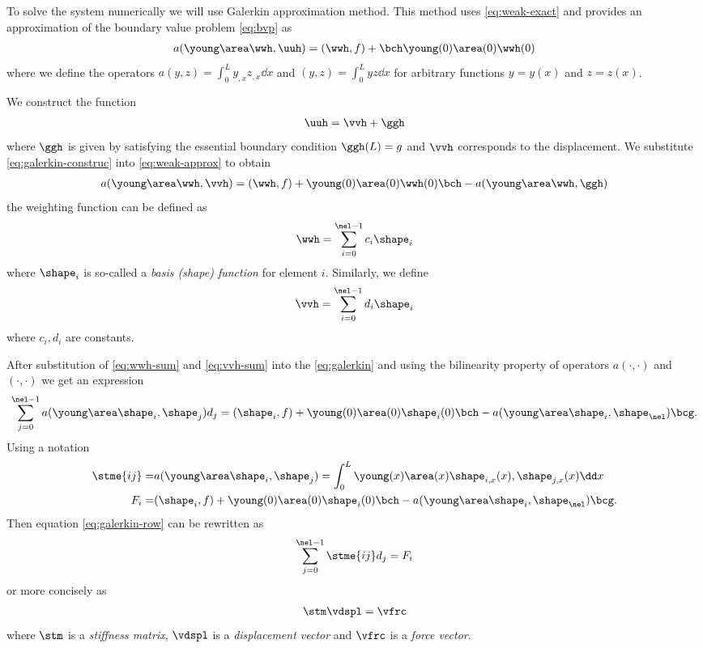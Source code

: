 \documentclass[twoside,a4paper,12pt]{article}
\newcommand{\+}[2]{\newcommand#1{{\color{\notcolor}#2}}}
\newcommand{\1}[2]{\newcommand{#1}[1]{{\color{\notcolor}#2}}}
\newcommand{\2}[2]{\newcommand{#1}[2]{{\color{\notcolor}#2}}}
\begin{document}
To solve the system numerically we will use Galerkin approximation
method. This method uses \eqref{eq:weak-exact} and provides an
approximation of the boundary value problem \eqref{eq:bvp} as
%
\begin{align}
a(\young\area\wwh,\uuh) = (\wwh,f) + \bch \young(0)\area(0)\wwh(0) \label{eq:weak-approx}
\end{align}
%
where we define the operators $a(y,z) = \int_0^L y_{,x} z_{,x} \dd x$
and $(y,z) = \int_0^L y z \dd x$ for arbitrary functions $y = y(x)$
and $z= z(x)$.

We construct the function
\begin{align}
  \uuh  = \vvh + \ggh \label{eq:galerkin-construc}
\end{align}
%
where $\ggh$ is given by satisfying the essential boundary condition
$\ggh(L) = g$ and $\vvh$ corresponds to the displacement. We
substitute \eqref{eq:galerkin-construc} into \eqref{eq:weak-approx} to
obtain
%
\begin{align}
  a(\young\area\wwh,\vvh) = (\wwh, f) + \young(0)\area(0)\wwh(0)\bch - 
  a(\young\area\wwh,\ggh)\label{eq:galerkin}
\end{align}
%
the weighting function can be defined as
%
\begin{align}
  \wwh = \sum_{i=0}^{\nel-1} c_i \shape_i \label{eq:wwh-sum}
\end{align}
%
where $\shape_i$ is so-called a \emph{basis (shape) function} for
element $i$. Similarly, we define
%
\begin{align}
  \vvh = \sum_{i=0}^{\nel-1} d_i \shape_i \label{eq:vvh-sum}
\end{align}
where $c_i, d_i$ are constants.

After substitution of \eqref{eq:wwh-sum} and \eqref{eq:vvh-sum} into
the \eqref{eq:galerkin} and using the bilinearity property of
operators $a(\cdot,\cdot)$ and $(\cdot,\cdot)$ we get an expression
%
\begin{align}
  \sum_{j=0}^{\nel-1} a(\young\area\shape_i, \shape_j) d_j = (\shape_i, f) + \young(0)\area(0)\shape_i(0) \bch - a(\young\area\shape_i,\shape_\nel)\bcg. \label{eq:galerkin-row}
\end{align}
%
Using a notation
%
\begin{subequations}
  \begin{align}
    \stme{ij} =& a(\young\area\shape_i,\shape_j) = \int_0^L \young(x)\area(x)\shape_{i,x}(x),\shape_{j,x}(x) \dd x \label{eq:stme} \\ 
    F_i =& (\shape_i,f) + \young(0)\area(0)\shape_i(0) \bch - a(\young\area\shape_i,\shape_{\nel}) \bcg .
  \end{align}\label{eq:fem-stme-fi}
\end{subequations}
%
Then equation \eqref{eq:galerkin-row} can be rewritten as
%
\begin{align}
  \sum_{j=0}^{\nel-1} \stme{ij} d_j = F_i
\end{align}
or more concisely as
\begin{align}
\stm \vdspl = \vfrc \label{eq:concise-eq}
\end{align}
where $\stm$ is a \emph{stiffness matrix}, $\vdspl$ is a
\emph{displacement vector} and $\vfrc$ is a \emph{force vector}.
\end{document}
